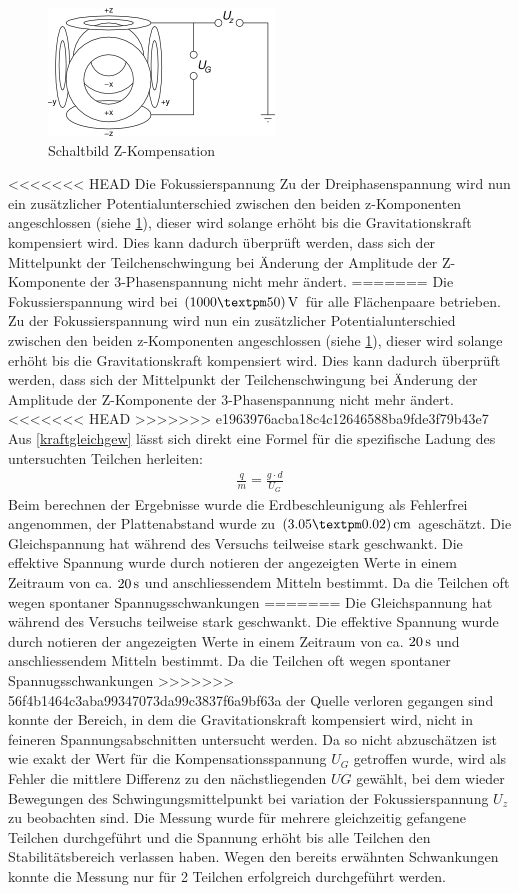 \documentclass[a4paper,12pt]{article}
\begin{document}
\begin{figure}[htb]
		\centering
		\includegraphics{Schaltbild_Z_Kompensation.png}
		\caption{Schaltbild Z-Kompensation}
		\label{schalt-z}
\end{figure}
<<<<<<< HEAD
Die Fokussierspannung
Zu der Dreiphasenspannung wird nun ein zusätzlicher Potentialunterschied zwischen den beiden z-Komponenten angeschlossen (siehe \ref{schalt-z}), dieser wird solange erhöht bis die Gravitationskraft
kompensiert wird. Dies kann dadurch überprüft werden, dass sich der Mittelpunkt der Teilchenschwingung bei Änderung der Amplitude der Z-Komponente der 3-Phasenspannung nicht mehr ändert.
=======
Die Fokussierspannung wird bei $\unit[(1000±50)]{V}$ für alle Flächenpaare betrieben.
Zu der Fokussierspannung wird nun ein zusätzlicher Potentialunterschied zwischen den beiden z-Komponenten angeschlossen
(siehe \ref{schalt-z}), dieser wird solange erhöht bis die Gravitationskraft
kompensiert wird. Dies kann dadurch überprüft werden, dass sich der Mittelpunkt der Teilchenschwingung bei Änderung
der Amplitude der Z-Komponente der 3-Phasenspannung nicht mehr ändert.
<<<<<<< HEAD
>>>>>>> e1963976acba18c4c12646588ba9fde3f79b43e7
Aus \ref{kraftgleichgew} lässt sich direkt eine Formel für die spezifische Ladung des untersuchten Teilchen herleiten:
\begin{align*}\label{zspezm}
	\frac{q}{m} = \frac{g\cdot d}{U_{G}}
\end{align*}
Beim berechnen der Ergebnisse wurde die Erdbeschleunigung als Fehlerfrei angenommen, der Plattenabstand wurde zu $\unit[(3.05±0.02)]{cm}$ ageschätzt.
Die Gleichspannung hat während des Versuchs teilweise
stark geschwankt. Die effektive Spannung wurde durch notieren der angezeigten Werte in einem Zeitraum
von ca. $\unit[20]{s}$ und anschliessendem Mitteln bestimmt. Da die Teilchen oft wegen spontaner Spannugsschwankungen
=======
Die Gleichspannung hat während des Versuchs teilweise 
stark geschwankt. Die effektive Spannung wurde durch notieren der angezeigten Werte in einem Zeitraum 
von ca. $\unit[20]{s}$ und anschliessendem Mitteln bestimmt. Da die Teilchen oft wegen spontaner Spannugsschwankungen 
>>>>>>> 56f4b1464c3aba99347073da99c3837f6a9bf63a
der Quelle verloren gegangen sind konnte der Bereich, in dem die Gravitationskraft kompensiert wird, nicht in feineren Spannungsabschnitten untersucht werden.
Da so nicht abzuschätzen ist wie exakt der Wert für die Kompensationsspannung $U_G$ getroffen wurde, wird als Fehler die mittlere Differenz zu den nächstliegenden 
$UG$ gewählt, bei dem wieder Bewegungen des Schwingungsmittelpunkt bei variation  der Fokussierspannung $U_z$ zu beobachten sind.
Die Messung wurde für mehrere gleichzeitig gefangene Teilchen durchgeführt und die Spannung erhöht bis alle Teilchen den Stabilitätsbereich verlassen haben.
Wegen den bereits erwähnten Schwankungen konnte die Messung nur für 2 Teilchen erfolgreich durchgeführt werden.
\end{document}
